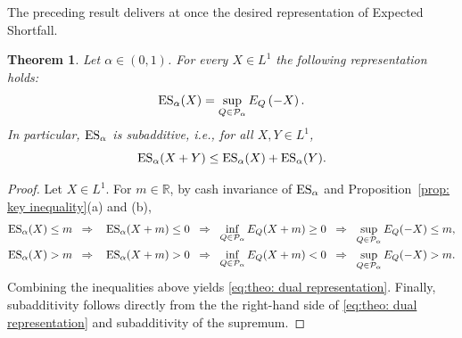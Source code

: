 \documentclass[12pt]{article}
\theoremstyle{plain}
\newtheorem{theorem}{Theorem}
\theoremstyle{definition}
\theoremstyle{remark}
\numberwithin{equation}{section}
\newcommand{\E}{E}
\newcommand{\probq}{Q}
\newcommand{\R}{\mathbb{R}}
\newcommand{\Q}{Q}
\newcommand{\cA}{\mathcal{A}}
\newcommand{\cP}{\mathcal{P}}
\newcommand{\ES}{\mathop {\rm ES}\nolimits}
\begin{document}
\smallskip

\noindent The preceding result delivers at once the desired representation of Expected Shortfall.

\begin{theorem}
\label{theo: dual representation}
Let $\alpha\in(0,1)$. For every $X \in L^1$ the following representation holds:
\begin{equation}
\label{eq:theo: dual representation}
\ES_{\alpha} (X) = \sup_{\Q \in \cP_\alpha} \E_\probq\left(-X\right).
\end{equation}
In particular, $\ES_\alpha$ is subadditive, i.e., for all $X,Y\in L^1$,
\[
\ES_\alpha(X+Y) \le \ES_\alpha(X)+\ES_\alpha(Y).
\]
\end{theorem}

\begin{proof}
Let $X\in L^1$. For $m \in \R$, by cash invariance of $\ES_\alpha$ and Proposition~\ref{prop: key inequality}(a) and (b),
\begin{align*}
\ES_\alpha(X) \leq  m&\;\; \Rightarrow \;\; \ \ES_\alpha(X+m) \leq 0 \;\; \Rightarrow \;\;
\inf_{\probq \in \cP_\alpha}\E_\probq(X+m)\ge0
\;\; \Rightarrow \;\;
\sup_{\probq \in \cP_\alpha}\E_\probq(-X )\leq m, \\
\ES_\alpha(X) > m&\;\; \Rightarrow \;\; \ \ES_\alpha(X+m) > 0 \;\; \Rightarrow \;\;
\inf_{\probq \in \cP_\alpha}\E_\probq(X+m) < 0
\;\; \Rightarrow \;\;
\sup_{\probq \in \cP_\alpha}\E_\probq(-X )>m.
\end{align*}
Combining the inequalities above yields \eqref{eq:theo: dual representation}. Finally, subadditivity follows directly from the the right-hand side of \eqref{eq:theo: dual representation} and subadditivity of the supremum.

\end{proof}
\end{document}
